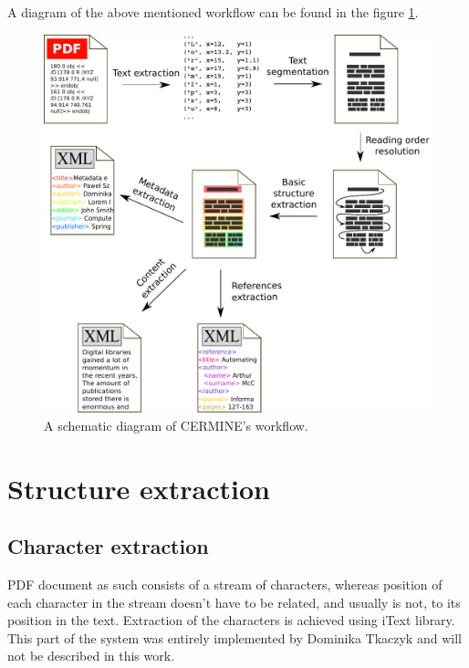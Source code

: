 A diagram of the above mentioned workflow can be found in the figure \ref{fig:pipeline}.
\begin{figure}[h]
  \centering
  \includegraphics[width=14cm]{graphics/pipeline}
  \caption{A schematic diagram of CERMINE's workflow.}
  \label{fig:pipeline}
\end{figure}

\section{Structure extraction}
\subsection{Character extraction}\label{sec:character_extraction}
PDF document as such consists of a stream of characters, whereas position of each character in the stream doesn't have to be related, and usually is not, to its position in the text. Extraction of the characters is achieved using iText library. This part of the system was entirely implemented by Dominika Tkaczyk and will not be described in this work.
